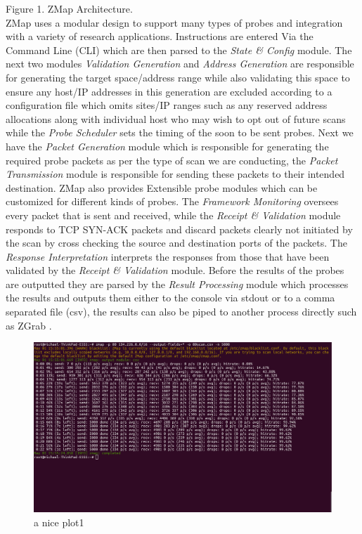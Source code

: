 \documentclass[a4wide,leqno,12pt]{report}
\begin{document}
Figure 1. ZMap Architecture.\\


ZMap uses a modular design to support many types of probes and integration with a variety of research applications. Instructions are entered Via the Command Line (CLI) which are then parsed to the \textit{State \& Config} module. The next two modules \textit{Validation Generation} and
\textit{Address Generation} are responsible for generating the target space/address range while also validating this space to ensure any host/IP addresses in this generation are excluded according to a configuration file which omits sites/IP ranges such as any reserved address allocations along with individual host who may wish to opt out of future scans \cite{durumeric2013zmap} while the \textit{Probe Scheduler} sets the timing of the soon to be sent probes. Next we have the \textit{Packet Generation} module which is responsible for generating the required probe packets as per the type of scan we are conducting, the \textit{Packet Transmission} module is responsible for sending these packets to their intended destination. ZMap also provides Extensible probe modules which can be customized for different kinds of probes. The \textit{Framework Monitoring} oversees every packet that is sent and received, while the \textit{Receipt \& Validation} module responds to TCP SYN-ACK packets and discard packets clearly not initiated by the scan by cross checking the source and destination ports of the packets. The \textit{Response Interpretation} interprets the responses from those that have been validated by the \textit{Receipt \& Validation} module. Before the results of the probes are outputted they are parsed by the \textit{Result Processing} module which processes the results and outputs them either to the console via stdout or to a comma separated file (csv), the results can also be piped to another process directly such as ZGrab \cite{durumeric2013zmap}.\\


\begin{figure}[H]
\centering
\includegraphics[scale=.3]{pdf_images/zmap_scan_exmaple_2}
\caption{a nice plot1}
\label{fig:zmap_scan_example}
\end{figure}
\end{document}
